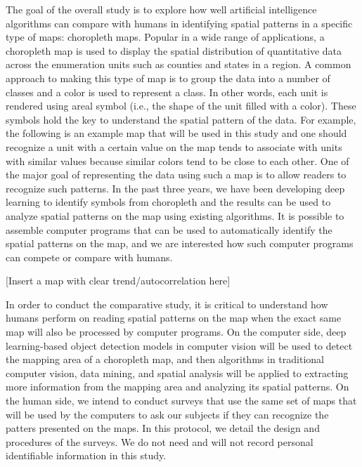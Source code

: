 The goal of the overall study is to explore how well artificial intelligence algorithms can compare with humans in identifying spatial patterns in a specific type of maps: choropleth maps. Popular in a wide range of applications, a choropleth map is used to display the spatial distribution of quantitative data across the enumeration units such as counties and states in a region. A common approach to making this type of map is to group the data into a number of classes and a color is used to represent a class. In other words, each unit is rendered using areal symbol (i.e., the shape of the unit filled with a color). These symbols hold the key to understand the spatial pattern of the data. For example, the following is an example map that will be used in this study and one should recognize a unit with a certain value on the map tends to associate with units with similar values because similar colors tend to be close to each other. One of the major goal of representing the data using such a map is to allow readers to recognize such patterns. In the past three years, we have been developing deep learning to identify symbols from choropleth and the results can be used to analyze spatial patterns on the map using existing algorithms. It is possible to assemble computer programs that can be used to automatically identify the spatial patterns on the map, and we are interested how such computer programs can compete or compare with humans.

[Insert a map with clear trend/autocorrelation here]

In order to conduct the comparative study, it is critical to understand how humans perform on reading spatial patterns on the map when the exact same map will also be processed by computer programs. On the computer side, deep learning-based object detection models in computer vision will be used to detect the mapping area of a choropleth map, and then algorithms in traditional computer vision, data mining, and spatial analysis will be applied to extracting more information from the mapping area and analyzing its spatial patterns. On the human side, we intend to conduct surveys that use the same set of maps that will be used by the computers to ask our subjects if they can recognize the patters presented on the maps. In this protocol, we detail the design and procedures of the surveys. We do not need and will not record personal identifiable information in this study.


